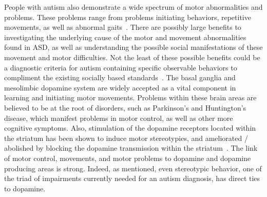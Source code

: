 \documentclass[man]{apa}
\begin{document}
People with autism also demonstrate a wide spectrum of motor abnormalities and problems. These problems range from problems initiating behaviors, repetitive movements, as well as abnormal gaits~\cite{RefWorks:100,RefWorks:99,RefWorks:98}. There are possibly large benefits to investigating the underlying  cause of the motor and movement abnormalities found in ASD, as well as understanding the possible social manifestations of these movement and motor difficulties. Not the least of these possible benefits could be a diagnostic criteria for autism containing specific observable behaviors to compliment the existing socially based standards~\cite{RefWorks:162}. The basal ganglia and mesolimbic dopamine system are widely accepted as a vital component in learning and initiating motor movements. Problems within these brain areas are believed to be at the root of disorders, such as Parkinson's and Huntington's disease, which manifest problems in motor control, as well as other more cognitive symptoms.  Also, stimulation of the dopamine receptors located within the striatum has been shown to induce motor stereotypies, and ameliorated / abolished by blocking the dopamine transmission within the striatum~\cite{Canales:2000:DA_Stereotypy,RefWorks:3,RefWorks:5}. The link of motor control, movements, and motor problems to dopamine and dopamine producing areas is strong. Indeed, as mentioned, even stereotypic behavior, one of the triad of impairments currently needed for an autism diagnosis, has direct ties to dopamine. 

\end{document}
